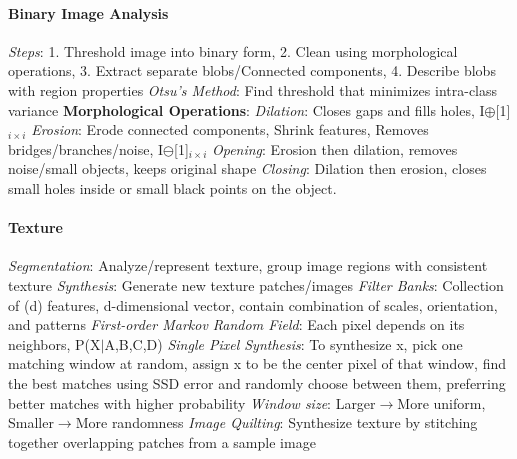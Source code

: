 \documentclass{article}
\begin{document}
\begin{multicols*}{2}
        \paragraph*{Binary Image Analysis}
        \textit{Steps}: 1. Threshold image into binary form, 2. Clean using morphological operations, 3. Extract
        separate blobs/Connected components, 4. Describe blobs with region properties\newline
        \textit{Otsu's Method}: Find threshold that minimizes intra-class variance\newline
        \textbf{Morphological Operations}:\newline
        \textit{Dilation}: Closes gaps and fills holes, I$\oplus$[1]$_{i\times i}$\newline
        \textit{Erosion}: Erode connected components, Shrink features, Removes bridges/branches/noise,
        I$\ominus$[1]$_{i\times i}$\newline
        \textit{Opening}: Erosion then dilation, removes noise/small objects, keeps original shape\newline
        \textit{Closing}: Dilation then erosion, closes small holes inside or small black points on the object.
        \paragraph*{Texture}
        \textit{Segmentation}: Analyze/represent texture, group image regions with consistent texture\newline
        \textit{Synthesis}: Generate new texture patches/images\newline
        \textit{Filter Banks}: Collection of (d) features, d-dimensional vector, contain combination of scales,
        orientation, and patterns\newline
        \textit{First-order Markov Random Field}: Each pixel depends on its neighbors, P(X$\mid$A,B,C,D)\newline
        \textit{Single Pixel Synthesis}: To synthesize x, pick one matching window at random, assign x to be the
        center pixel of that window, find the best matches using SSD error and randomly choose between them,
        preferring better matches with higher probability\newline
        \textit{Window size}: Larger$\rightarrow$More uniform, Smaller$\rightarrow$More randomness\newline
        \textit{Image Quilting}: Synthesize texture by stitching together overlapping patches from a sample image

\end{multicols*}
\end{document}
